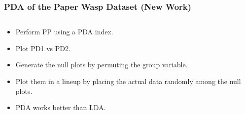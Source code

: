 \documentclass{beamer}
\begin{document}
\begin{frame}
	\frametitle{PDA of the Paper Wasp Dataset (New Work) }
	\begin{columns}
		\begin{column}{0.4\textwidth}
		  \begin{itemize}
			  \item Perform PP using a PDA index.
			\item Plot PD1 vs PD2.
			  \item Generate the null plots by permuting the group variable. 
			  \item Plot them in a lineup by placing the actual data randomly among the null plots.
			\item PDA works better than LDA.
		  \end{itemize}		
			
		\end{column}
		
		\begin{column}{0.6\textwidth}
			 \begin{center}  \end{center}
		\end{column}
	\end{columns}  

\end{frame}
\end{document}
